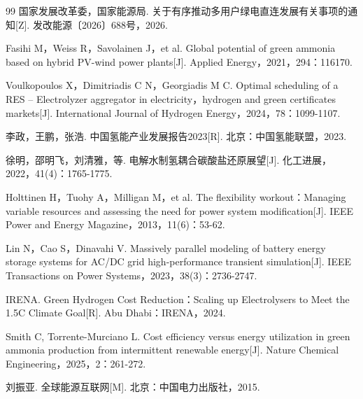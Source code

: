 \documentclass[withoutpreface,bwprint]{cumcmthesis}
\begin{document}










\newpage
\begin{thebibliography}{99}
国家发展改革委，国家能源局.
\newblock 关于有序推动多用户绿电直连发展有关事项的通知[Z].
\newblock 发改能源〔2026〕688号，2026.

Fasihi M，Weiss R，Savolainen J，et al.
\newblock Global potential of green ammonia based on hybrid PV-wind power plants[J].
\newblock Applied Energy，2021，294：116170.

Voulkopoulos X，Dimitriadis C N，Georgiadis M C.
\newblock Optimal scheduling of a RES -- Electrolyzer aggregator in electricity，hydrogen and green certificates markets[J].
\newblock International Journal of Hydrogen Energy，2024，78：1099-1107.

李政，王鹏，张浩.
\newblock 中国氢能产业发展报告2023[R].
\newblock 北京：中国氢能联盟，2023.

徐明，邵明飞，刘清雅，等.
\newblock 电解水制氢耦合碳酸盐还原展望[J].
\newblock 化工进展，2022，41(4)：1765-1775.

Holttinen H，Tuohy A，Milligan M，et al.
\newblock The flexibility workout：Managing variable resources and assessing the need for power system modification[J].
\newblock IEEE Power and Energy Magazine，2013，11(6)：53-62.

Lin N，Cao S，Dinavahi V.
\newblock Massively parallel modeling of battery energy storage systems for AC/DC grid high-performance transient simulation[J].
\newblock IEEE Transactions on Power Systems，2023，38(3)：2736-2747.

IRENA.
\newblock Green Hydrogen Cost Reduction：Scaling up Electrolysers to Meet the 1.5{\textdegree}C Climate Goal[R].
\newblock Abu Dhabi：IRENA，2024.

Smith C, Torrente-Murciano L.
\newblock Cost efficiency versus energy utilization in green ammonia production from intermittent renewable energy[J].
\newblock Nature Chemical Engineering，2025，2：261-272.

刘振亚.
\newblock 全球能源互联网[M].
\newblock 北京：中国电力出版社，2015.
\end{thebibliography}
\end{document}
